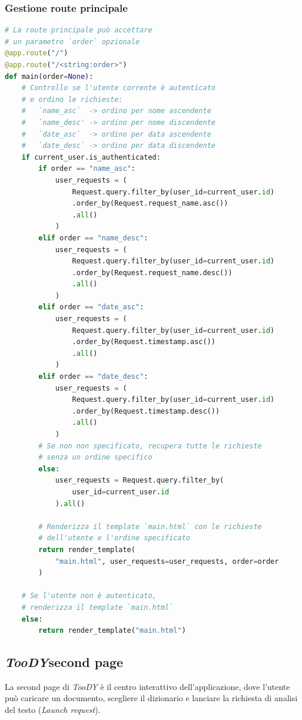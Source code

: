 \documentclass[12pt]{report}
\newcommand{\toody}{\textsl{TooDY}\xspace}
\begin{document}
\subsubsection{Gestione route principale}
\begin{lstlisting}[language=Python]
# La route principale può accettare
# un parametro `order` opzionale
@app.route("/")
@app.route("/<string:order>")
def main(order=None):
    # Controllo se l'utente corrente è autenticato
    # e ordino le richieste:
    #   `name_asc`  -> ordino per nome ascendente
    #   `name_desc' -> ordino per nome discendente
    #   `date_asc`  -> ordino per data ascendente
    #   `date_desc` -> ordino per data discendente
    if current_user.is_authenticated:
        if order == "name_asc":
            user_requests = (
                Request.query.filter_by(user_id=current_user.id)
                .order_by(Request.request_name.asc())
                .all()
            )
        elif order == "name_desc":
            user_requests = (
                Request.query.filter_by(user_id=current_user.id)
                .order_by(Request.request_name.desc())
                .all()
            )
        elif order == "date_asc":
            user_requests = (
                Request.query.filter_by(user_id=current_user.id)
                .order_by(Request.timestamp.asc())
                .all()
            )
        elif order == "date_desc":
            user_requests = (
                Request.query.filter_by(user_id=current_user.id)
                .order_by(Request.timestamp.desc())
                .all()
            )
        # Se non non specificato, recupera tutte le richieste
        # senza un ordine specifico
        else:
            user_requests = Request.query.filter_by(
                user_id=current_user.id
            ).all()

        # Renderizza il template `main.html` con le richieste
        # dell'utente e l'ordine specificato
        return render_template(
            "main.html", user_requests=user_requests, order=order
        )

    # Se l'utente non è autenticato,
    # renderizza il template `main.html`
    else:
        return render_template("main.html")
\end{lstlisting}


\subsection{\toody \textsf{second page}}
La \textsf{second page} di \toody è il centro interattivo dell'applicazione, dove l'utente può caricare un documento, scegliere il dizionario e lanciare la richiesta di analisi del testo (\textit{Launch request}).
\end{document}
